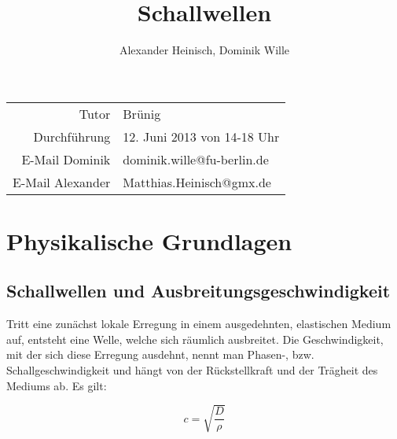 \documentclass{article}
\title{Schallwellen}
\author{Alexander Heinisch, Dominik Wille}
\begin{document}
\maketitle

{\begin{center}
\begin{minipage}{\linewidth}
\centering
\label{wtd}
\end{minipage}
\end{center}

\vspace{7cm}
\noindent
\begin{center}
\begin{tabular}{r l}
Tutor & Brünig\\
Durchführung & 12. Juni 2013 von 14-18 Uhr \\

E-Mail Dominik & dominik.wille@fu-berlin.de \\
E-Mail Alexander & Matthias.Heinisch@gmx.de \\
\end{tabular}
\end{center}

\newpage
\tableofcontents
\newpage

\section{Physikalische Grundlagen}
\subsection{Schallwellen und Ausbreitungsgeschwindigkeit}
Tritt eine zunächst lokale Erregung in einem ausgedehnten, elastischen Medium auf, entsteht eine Welle, welche sich räumlich ausbreitet. Die Geschwindigkeit, mit der sich diese Erregung ausdehnt, nennt man Phasen-, bzw. Schallgeschwindigkeit und hängt von der Rückstellkraft und der Trägheit des Mediums ab. Es gilt:

\begin{equation}
\label{c}
c=\sqrt{\frac{D}{\rho}}
\end{equation}

}
\end{document}

